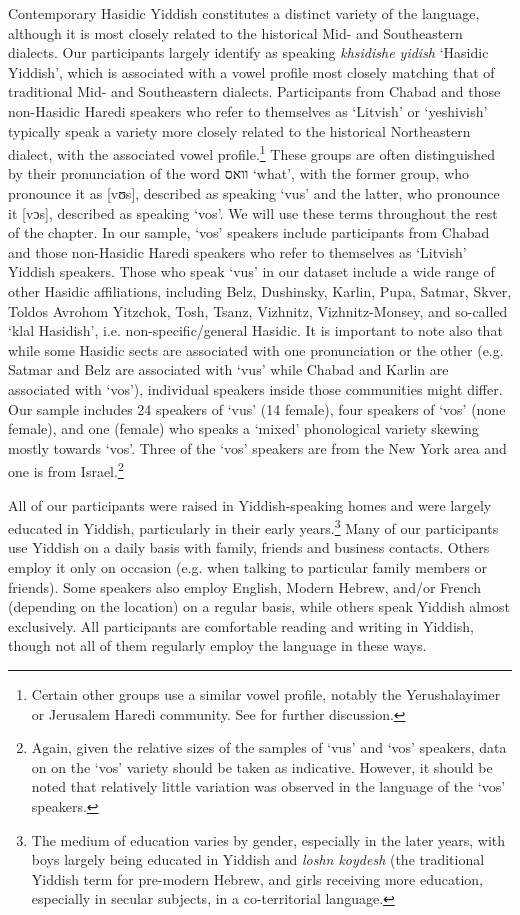 \documentclass[output=paper, hidelinks]{langscibook}
\begin{document}
Contemporary Hasidic Yiddish constitutes a distinct variety of the language, although it is most closely related to the historical Mid- and Southeastern dialects. Our participants largely identify as speaking \textit{khsidishe yidish} `Hasidic Yiddish', which is associated with a vowel profile most closely matching that of traditional Mid- and Southeastern dialects. Participants from Chabad and those non-Hasidic Haredi speakers who refer to themselves as `Litvish’ or `yeshivish' typically speak a variety more closely related to the historical Northeastern dialect, with the associated vowel profile.\footnote{Certain other groups use a similar vowel profile, notably the Yerushalayimer or Jerusalem Haredi community. See \citealt{Author21} for further discussion.} These groups are often distinguished by their pronunciation of the word וואס ‘what’, with the former group, who pronounce it as [vʊs], described as speaking `vus' and the latter, who pronounce it [vɔs], described as speaking `vos'. We will use these terms throughout the rest of the chapter. In our sample, ‘vos’ speakers include participants from Chabad and those non-Hasidic Haredi speakers who refer to themselves as ‘Litvish’ Yiddish speakers. Those who speak ‘vus’ in our dataset include a wide range of other Hasidic affiliations, including Belz, Dushinsky, Karlin, Pupa, Satmar, Skver, Toldos Avrohom Yitzchok, Tosh, Tsanz, Vizhnitz, Vizhnitz-Monsey, and so-called ‘klal Hasidish’, i.e. non-specific/general Hasidic. It is important to note also that while some Hasidic sects are associated with one pronunciation or the other (e.g. Satmar and Belz are associated with ‘vus’ while Chabad and Karlin are associated with ‘vos’), individual speakers inside those communities might differ. Our sample includes 24 speakers of ‘vus’ (14 female), four speakers of ‘vos’ (none female), and one (female) who speaks a ‘mixed’ phonological variety skewing mostly towards `vos'. Three of the ‘vos’ speakers are from the New York area and one is from Israel.\footnote{Again, given the relative sizes of the samples of `vus' and `vos' speakers, data on on the `vos' variety should be taken as indicative. However, it should be noted that relatively little variation was observed in the language of the `vos' speakers.}

All of our participants were raised in Yiddish-speaking homes and were largely educated in Yiddish, particularly in their early years.\footnote{The medium of education varies by gender, especially in the later years, with boys largely being educated in Yiddish and \textit{loshn koydesh} (the traditional Yiddish term for pre-modern Hebrew, and girls receiving more education, especially in secular subjects, in a co-territorial language.} Many of our participants use Yiddish on a daily basis with family, friends and business contacts. Others employ it only on occasion (e.g. when talking to particular family members or friends). Some speakers also employ English, Modern Hebrew, and/or French (depending on the location) on a regular basis, while others speak Yiddish almost exclusively. All participants are comfortable reading and writing in Yiddish, though not all of them regularly employ the language in these ways. 
\end{document}
